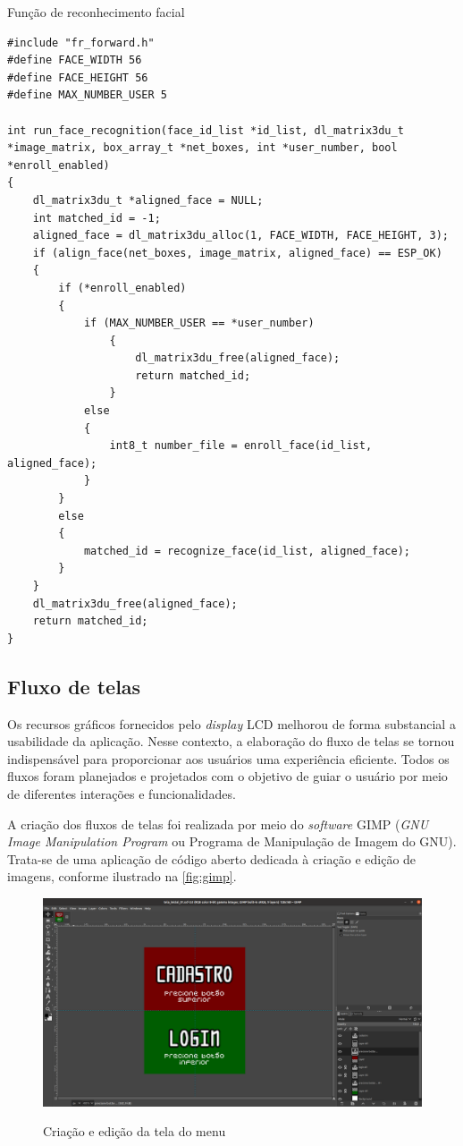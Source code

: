 \begin{sourcecode}[htb]
\caption{\label{code:reconhecimento}Função de reconhecimento facial}
\begin{lstlisting}[frame=single]
#include "fr_forward.h"
#define FACE_WIDTH 56
#define FACE_HEIGHT 56
#define MAX_NUMBER_USER 5

int run_face_recognition(face_id_list *id_list, dl_matrix3du_t *image_matrix, box_array_t *net_boxes, int *user_number, bool *enroll_enabled)
{
    dl_matrix3du_t *aligned_face = NULL;
    int matched_id = -1;
    aligned_face = dl_matrix3du_alloc(1, FACE_WIDTH, FACE_HEIGHT, 3);
    if (align_face(net_boxes, image_matrix, aligned_face) == ESP_OK)
    {
        if (*enroll_enabled)
        {
            if (MAX_NUMBER_USER == *user_number)
			    {
				    dl_matrix3du_free(aligned_face);
				    return matched_id;
			    }
            else
            {
                int8_t number_file = enroll_face(id_list, aligned_face);
            }
        }
        else
        {
            matched_id = recognize_face(id_list, aligned_face);
        }
    }
    dl_matrix3du_free(aligned_face);
    return matched_id;
}
\end{lstlisting}
\fonte{}
\end{sourcecode}

\subsection{Fluxo de telas}\label{sec:telas}

Os recursos gráficos fornecidos pelo \textit{display} LCD melhorou de 
forma substancial a usabilidade da aplicação. Nesse contexto, a elaboração 
do fluxo de telas se tornou indispensável para proporcionar aos usuários 
uma experiência eficiente. Todos os fluxos foram planejados e 
projetados com o objetivo de guiar o usuário por meio 
de diferentes interações e funcionalidades.

A criação dos fluxos de telas foi realizada por meio do \textit{software} GIMP 
(\textit{GNU Image Manipulation Program} ou Programa de Manipulação 
de Imagem do GNU). Trata-se de uma aplicação de código aberto 
dedicada à criação e edição de imagens, conforme ilustrado 
na \autoref{fig:gimp}.

\begin{figure}[h!]
    \centering
    \caption{Criação e edição da tela do menu}
    \includegraphics[scale=0.2]{figuras/gimp.png}
    \legend{}
    \label{fig:gimp}
    \centering
\end{figure}

